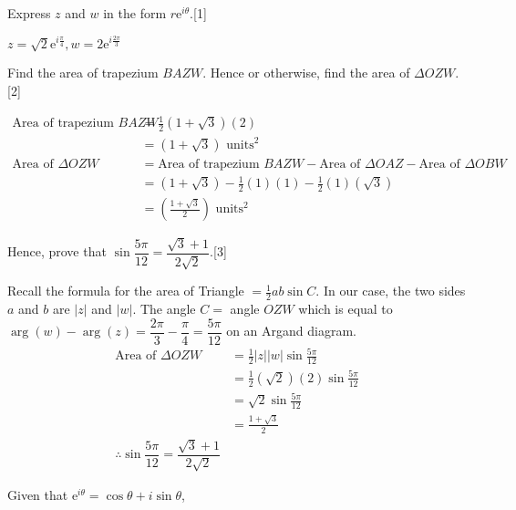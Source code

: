 \documentclass[12pt, a4 paper]{article}
\begin{document}
\begin{outline}[enumerate]
	\2 Express $z$ and $w$ in the form $r\mathrm{e}^{i\theta}$.\hfill[1]
	\begin{answer}
		$z=\sqrt{2}\mathrm{e}^{i\frac{\pi}{4}}, w=2\mathrm{e}^{i\frac{2\pi}{3}}$
	\end{answer}
	\2 Find the area of trapezium $BAZW$. Hence or otherwise, find the area of $\Delta OZW$.\hfill[2]
	\begin{answer}
		\begin{align*}
			\textrm{Area of trapezium }BAZW & = \frac{1}{2}(1+\sqrt{3})(2)                                                                  \\
			                                & = (1+\sqrt{3})\textrm{ units}^2                                                               \\
			\textrm{Area of }\Delta OZW     & = \textrm{Area of trapezium }BAZW - \textrm{Area of }\Delta OAZ - \textrm{Area of }\Delta OBW \\
			                                & = (1+\sqrt{3}) - \frac{1}{2}(1)(1) - \frac{1}{2}(1)(\sqrt{3})                                 \\
			                                & = (\frac{1+\sqrt{3}}{2})\textrm{ units}^2
		\end{align*}
	\end{answer}
	\2 Hence, prove that $\sin{\dfrac{5\pi}{12}}=\dfrac{\sqrt{3}+1}{2\sqrt{2}}$.\hfill[3]
	\begin{answer}
		Recall the formula for the area of Triangle $= \frac{1}{2}ab \sin C$. In our case, the two sides $a$ and $b$ are $|z|$ and $|w|$. The angle $C=$ angle $OZW$ which is equal to $\arg{(w)} - \arg{(z)}=\dfrac{2\pi}{3} - \dfrac{\pi}{4} = \dfrac{5\pi}{12}$ on an Argand diagram.
		\begin{align*}
			\textrm{Area of }\Delta OZW & = \frac{1}{2}|z||w|\sin{\frac{5\pi}{12}}        \\
			                            & = \frac{1}{2}(\sqrt{2})(2)\sin{\frac{5\pi}{12}} \\
			                            & = \sqrt{2}\sin{\frac{5\pi}{12}}                 \\
			                            & = \frac{1+\sqrt{3}}{2}                          \\
			\therefore \sin{\dfrac{5\pi}{12}}=\dfrac{\sqrt{3}+1}{2\sqrt{2}}
		\end{align*}
	\end{answer}
	\1 Given that $\mathrm{e}^{i\theta}=\cos{\theta}+i\sin{\theta}$, %


\end{outline}
\end{document}
